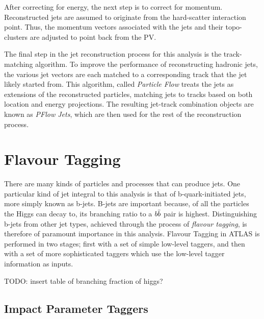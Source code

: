         After correcting for energy, the next step is to correct for momentum.
        Reconstructed jets are assumed to originate from the hard-scatter interaction point.
        Thus, the momentum vectors associated with the jets and their topo-clusters are adjusted to point back from the PV.

        The final step in the jet reconstruction process for this analysis is the track-matching algorithm.
        To improve the performance of reconstructing hadronic jets,
            the various jet vectors are each matched to a corresponding track that the jet likely started from.
        This algorithm, called \textit{Particle Flow} treats the jets as extensions of the reconstructed particles,
            matching jets to tracks based on both location and energy projections.
        The resulting jet-track combination objects are known as \textit{PFlow Jets},
            which are then used for the rest of the reconstruction process\cite{pflow}.


    \section{Flavour Tagging}
        
        There are many kinds of particles and processes that can produce jets.
        One particular kind of jet integral to this analysis is that of b-quark-initiated jets,
            more simply known as b-jets.
        B-jets are important because, of all the particles the Higgs can decay to,
            its branching ratio to a $b \bar{b}$ pair is highest.
        Distinguishing b-jets from other jet types,
            achieved through the process of \textit{flavour tagging},
            is therefore of paramount importance in this analysis.
        Flavour Tagging in ATLAS is performed in two stages;
            first with a set of simple low-level taggers,
            and then with a set of more sophisticated taggers which use the low-level tagger information as inputs.

        TODO: insert table of branching fraction of higgs?

        \subsection{Impact Parameter Taggers}

